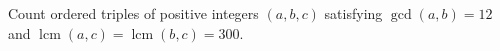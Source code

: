 Count ordered triples of positive integers $(a,b,c)$ satisfying $\gcd(a,b)=12$ and $\operatorname{lcm}(a,c)=\operatorname{lcm}(b,c)=300$.
